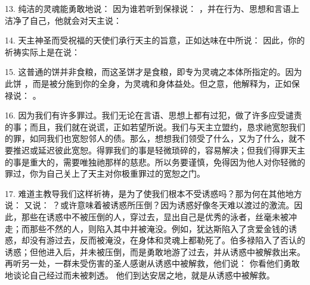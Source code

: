 13.  纯洁的灵魂能勇敢地说： 因为谁若听到保禄说： ，并在行为、思想和言语上洁净了自己，他就会对天主说：\par

14.  天主神圣而受祝福的天使们承行天主的旨意，正如达味在中所说： 因此，你的祈祷实际上是在说：\par

15.  这普通的饼并非食粮，而这圣饼才是食粮，即专为灵魂之本体所指定的。因为此饼 ，而是被分施到你的全身，为灵魂和身体益处。但之意，他解释为，正如保禄说： 。\par

16.  因为我们有许多罪过。我们无论在言语、思想上都有过犯，做了许多应受谴责的事；而且，我们就在说谎，正如若望所说。我们与天主立盟约，恳求祂宽恕我们的罪，如同我们也宽恕邻人的债。那么，想想我们领受了什么，又为了什么，就不要推迟或延迟彼此宽恕。得罪我们的事是轻微琐碎的，容易解决；但我们得罪天主的事是重大的，需要唯独祂那样的慈悲。所以务要谨慎，免得因为他人对你轻微的罪过，你为自己关上了天主对你极重罪过的宽恕之门。\par

17.  难道主教导我们这样祈祷，是为了使我们根本不受诱惑吗？那为何在其他地方说： 又说： ？或许意味着被诱惑所压倒？因为诱惑好像冬天难以渡过的激流。因此，那些在诱惑中不被压倒的人，穿过去，显出自己是优秀的泳者，丝毫未被冲走；而那些不然的人，则陷入其中并被淹没。例如，犹达斯陷入了贪爱金钱的诱惑，却没有游过去，反而被淹没，在身体和灵魂上都勒死了。伯多禄陷入了否认的诱惑；但他进入后，并未被压倒，而是勇敢地游了过去，并从诱惑中被解救出来。再听另一处，一群未受伤害的圣人感谢从诱惑中被解救，他们说： 你看他们勇敢地谈论自己经过而未被刺透。 他们到达安居之地，就是从诱惑中被解救。\par

